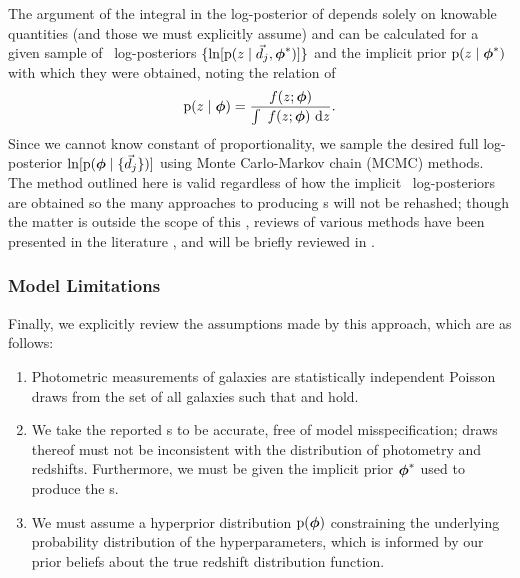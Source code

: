 The argument of the integral in the log-posterior of  depends solely on knowable quantities (and those we must explicitly assume) and can be calculated for a given sample of \pz\ log-posteriors $\{\ln[\mathrm{p}(z \mid \vec{d}_{j}, {\boldsymbol{\phi}}^{*})]\}$ and the implicit prior $\mathrm{p}(z \mid {\ensuremath{\boldsymbol{\phi}}}^{*})$ with which they were obtained, noting the relation of 
\begin{equation}
\eqlabel{eq:params}
\pr{z \gvn \ndphi} = \frac{f(z; \ndphi)}{\integral{f(z; \ndphi)}{z}}.
\end{equation}
Since we cannot know constant of proportionality, we sample the desired full log-posterior $\ln[\mathrm{p}({\boldsymbol{\phi}} \mid \{\vec{d}_{j}\})]$ using Monte Carlo-Markov chain (MCMC) methods.  
The method outlined here is valid regardless of how the implicit \pz\ log-posteriors are obtained so the many approaches to producing \pzpdf s will not be rehashed; though the matter is outside the scope of this \paper, reviews of various methods have been presented in the literature \citep{Sheldon2012, Ball2008, CarrascoKind2013, CarrascoKind2014a}, and will be briefly reviewed in .
%

\subsubsection{Model Limitations}

Finally, we explicitly review the assumptions made by this approach, which are as follows:

\begin{enumerate}
	\item Photometric measurements of galaxies are statistically independent Poisson draws from the set of all galaxies such that  and  hold.
	\item We take the reported \pzip s to be accurate, free of model misspecification; draws thereof must not be inconsistent with the distribution of photometry and redshifts.
	Furthermore, we must be given the implicit prior ${\boldsymbol{\phi}}^{*}$ used to produce the \pzip s.
	\item We must assume a hyperprior distribution $\mathrm{p}({\boldsymbol{\phi}})$ constraining the underlying probability distribution of the hyperparameters, which is informed by our prior beliefs about the true redshift distribution function.
\end{enumerate}

